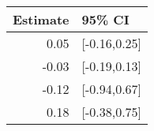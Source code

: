 \begin{tabular}{rl}
  \hline
Estimate & 95\% CI \\ 
  \hline
0.05 & [-0.16,0.25] \\ 
  -0.03 & [-0.19,0.13] \\ 
  -0.12 & [-0.94,0.67] \\ 
  0.18 & [-0.38,0.75] \\ 
   \hline
\end{tabular}

